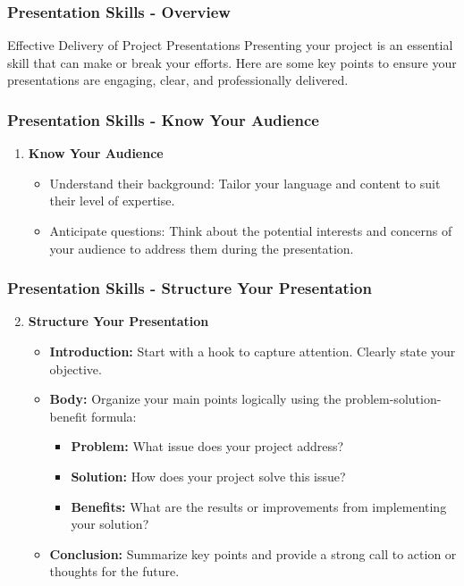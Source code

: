\documentclass[aspectratio=169]{beamer}
\begin{document}
\begin{frame}[fragile]
    \frametitle{Presentation Skills - Overview}
    \begin{block}{Effective Delivery of Project Presentations}
        Presenting your project is an essential skill that can make or break your efforts. Here are some key points to ensure your presentations are engaging, clear, and professionally delivered.
    \end{block}
\end{frame}

\begin{frame}[fragile]
    \frametitle{Presentation Skills - Know Your Audience}
    \begin{enumerate}
        \item \textbf{Know Your Audience}
            \begin{itemize}
                \item Understand their background: Tailor your language and content to suit their level of expertise.
                \item Anticipate questions: Think about the potential interests and concerns of your audience to address them during the presentation.
            \end{itemize}
    \end{enumerate}
\end{frame}

\begin{frame}[fragile]
    \frametitle{Presentation Skills - Structure Your Presentation}
    \begin{enumerate}
        \setcounter{enumi}{1} %
        \item \textbf{Structure Your Presentation}
            \begin{itemize}
                \item \textbf{Introduction:} Start with a hook to capture attention. Clearly state your objective.
                \item \textbf{Body:} Organize your main points logically using the problem-solution-benefit formula:
                    \begin{itemize}
                        \item \textbf{Problem:} What issue does your project address?
                        \item \textbf{Solution:} How does your project solve this issue?
                        \item \textbf{Benefits:} What are the results or improvements from implementing your solution?
                    \end{itemize}
                \item \textbf{Conclusion:} Summarize key points and provide a strong call to action or thoughts for the future.
            \end{itemize}
    \end{enumerate}
\end{frame}
\end{document}
